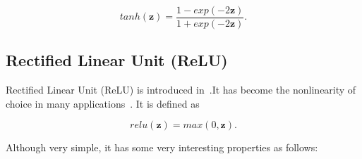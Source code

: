\begin{equation}\label{eq:tanh}
    tanh(\mathbf{z}) = \frac{1-exp(-2\mathbf{z})}{1+exp(-2\mathbf{z})}.
\end{equation}


\subsection{Rectified Linear Unit (ReLU)}\label{sec:relu}
Rectified Linear Unit (ReLU) is introduced in~\cite{krizhevsky2012imagenet}.It has become the nonlinearity of choice in many applications~\cite{krizhevsky2012imagenet}\cite{he2016deep}. It is defined as

\begin{equation}\label{eq:relu}
    relu(\mathbf{z}) = max(0, \mathbf{z}).
\end{equation}

Although very simple, it has some very interesting properties\cite{he2015delving} as follows:

